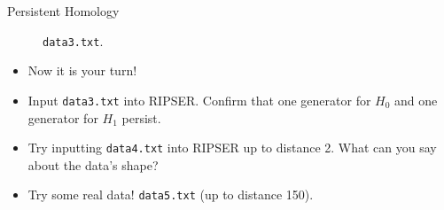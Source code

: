 \begin{frame}{Persistent Homology}
\begin{center}

\begin{figure}
\caption{\texttt{data3.txt}.}
\end{figure}
\end{center}
\begin{itemize}
\item Now it is your turn!
\item Input \texttt{data3.txt} into RIPSER. Confirm that one generator for $H_0$ and one generator for $H_1$ persist.
\item Try inputting \texttt{data4.txt} into RIPSER up to distance 2. What can you say about the data's shape?
\item Try some real data! \texttt{data5.txt} (up to distance 150).
\end{itemize}
\end{frame}